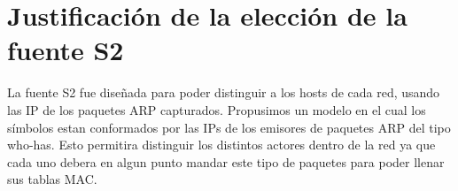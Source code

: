 \section{Justificación de la elección de la fuente S2}

La fuente S2 fue diseñada para poder distinguir a los hosts de cada red, usando las IP de los paquetes ARP capturados.
Propusimos un modelo en el cual los símbolos estan conformados por las IPs de los emisores de paquetes ARP del tipo who-has. 
Esto permitira distinguir los distintos actores dentro de la red ya que cada uno debera en algun punto mandar este tipo de paquetes para poder llenar sus tablas MAC.